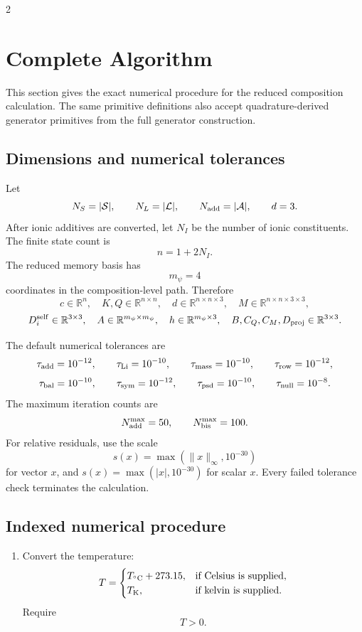\documentclass[10pt]{article}
\newcommand{\R}{\mathbb{R}}
\begin{document}
\begin{multicols}{2}
\section{Complete Algorithm}

This section gives the exact numerical procedure for the reduced composition
calculation. The same primitive definitions also accept quadrature-derived
generator primitives from the full generator construction.

\subsection{Dimensions and numerical tolerances}

Let
\[
N_S=|\mathcal S|,
\qquad
N_L=|\mathcal L|,
\qquad
N_{\rm add}=|\mathcal A|,
\qquad
d=3.
\]
After ionic additives are converted, let \(N_I\) be the number of ionic
constituents. The finite state count is
\[
n=1+2N_I.
\]
The reduced memory basis has
\[
m_\psi=4
\]
coordinates in the composition-level path. Therefore
\[
c\in\R^n,
\quad
K,Q\in\R^{n\times n},
\quad
d\in\R^{n\times n\times 3},
\quad
M\in\R^{n\times n\times 3\times 3},
\]
\[
D^{\rm self}_i\in\R^{3\times3},
\quad
A\in\R^{m_\psi\times m_\psi},
\quad
h\in\R^{m_\psi\times3},
\quad
B,C_Q,C_M,D_{\rm proj}\in\R^{3\times3}.
\]

The default numerical tolerances are
\[
\tau_{\rm add}=10^{-12},
\qquad
\tau_{\rm Li}=10^{-10},
\qquad
\tau_{\rm mass}=10^{-10},
\qquad
\tau_{\rm row}=10^{-12},
\]
\[
\tau_{\rm bal}=10^{-10},
\qquad
\tau_{\rm sym}=10^{-12},
\qquad
\tau_{\rm psd}=10^{-10},
\qquad
\tau_{\rm null}=10^{-8}.
\]
The maximum iteration counts are
\[
N_{\rm add}^{\max}=50,
\qquad
N_{\rm bis}^{\max}=100.
\]
For relative residuals, use the scale
\[
s(x)=\max(\|x\|_\infty,10^{-30})
\]
for vector \(x\), and \(s(x)=\max(|x|,10^{-30})\) for scalar \(x\).
Every failed tolerance check terminates the calculation.

\subsection{Indexed numerical procedure}

\begin{enumerate}[label=\textbf{A\arabic*.}]
\item Convert the temperature:
\[
T=
\begin{cases}
T_{{}^\circ{\rm C}}+273.15, & \text{if Celsius is supplied},\\
T_{\rm K}, & \text{if kelvin is supplied}.
\end{cases}
\]
Require
\[
T>0.
\]


\end{enumerate}
\end{multicols}
\end{document}
